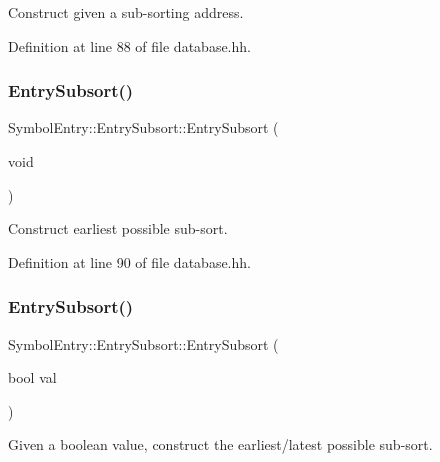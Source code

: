 Construct given a sub-\/sorting address. 



Definition at line 88 of file database.\+hh.

\mbox{\label{class_symbol_entry_1_1_entry_subsort_ad16bd44c1e8a4278f2d8def2b7096b1d}} 
\subsubsection{\texorpdfstring{EntrySubsort()}{EntrySubsort()}\hspace{0.1cm}{\footnotesize\ttfamily [2/4]}}
{\footnotesize\ttfamily Symbol\+Entry\+::\+Entry\+Subsort\+::\+Entry\+Subsort (\begin{DoxyParamCaption}\item[{void}]{ }\end{DoxyParamCaption})\hspace{0.3cm}{\ttfamily [inline]}}



Construct earliest possible sub-\/sort. 



Definition at line 90 of file database.\+hh.

\mbox{\label{class_symbol_entry_1_1_entry_subsort_aaf47207b765a3369dd0b86db939d6c75}} 
\subsubsection{\texorpdfstring{EntrySubsort()}{EntrySubsort()}\hspace{0.1cm}{\footnotesize\ttfamily [3/4]}}
{\footnotesize\ttfamily Symbol\+Entry\+::\+Entry\+Subsort\+::\+Entry\+Subsort (\begin{DoxyParamCaption}\item[{bool}]{val }\end{DoxyParamCaption})\hspace{0.3cm}{\ttfamily [inline]}}



Given a boolean value, construct the earliest/latest possible sub-\/sort. 



